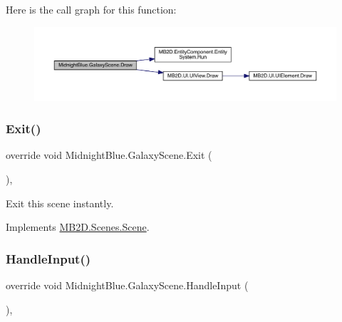 Here is the call graph for this function\+:\nopagebreak
\begin{figure}[H]
\begin{center}
\leavevmode
\includegraphics[width=350pt]{class_midnight_blue_1_1_galaxy_scene_a3646fcf97e067bac267d42aad66e71c4_cgraph}
\end{center}
\end{figure}
\hypertarget{class_midnight_blue_1_1_galaxy_scene_a7a96978e050da997330bcc0f3cd00f9e}{}\label{class_midnight_blue_1_1_galaxy_scene_a7a96978e050da997330bcc0f3cd00f9e} 
\subsubsection{\texorpdfstring{Exit()}{Exit()}}
{\footnotesize\ttfamily override void Midnight\+Blue.\+Galaxy\+Scene.\+Exit (\begin{DoxyParamCaption}{ }\end{DoxyParamCaption})\hspace{0.3cm}{\ttfamily [inline]}, {\ttfamily [virtual]}}



Exit this scene instantly. 



Implements \hyperlink{class_m_b2_d_1_1_scenes_1_1_scene_a099b79e16d23b67349847999d2336813}{M\+B2\+D.\+Scenes.\+Scene}.

\hypertarget{class_midnight_blue_1_1_galaxy_scene_afd7f8c9f6d0cf6ded10299d4b0015c29}{}\label{class_midnight_blue_1_1_galaxy_scene_afd7f8c9f6d0cf6ded10299d4b0015c29} 
\subsubsection{\texorpdfstring{Handle\+Input()}{HandleInput()}}
{\footnotesize\ttfamily override void Midnight\+Blue.\+Galaxy\+Scene.\+Handle\+Input (\begin{DoxyParamCaption}{ }\end{DoxyParamCaption})\hspace{0.3cm}{\ttfamily [inline]}, {\ttfamily [virtual]}}



